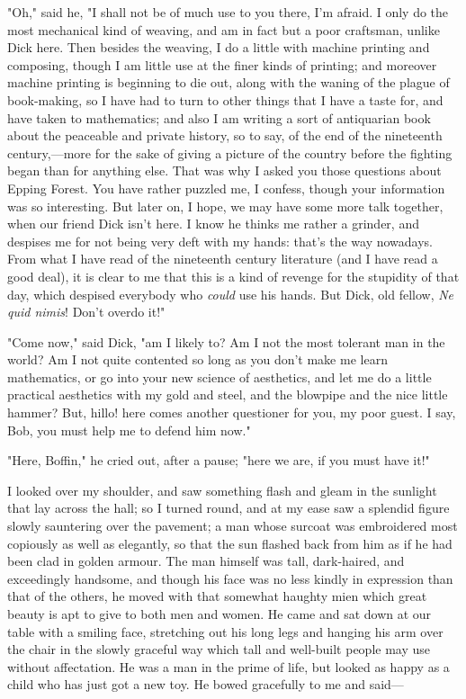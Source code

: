 "Oh," said he, "I shall not be of much use to you there, I'm afraid. I
only do the most mechanical kind of weaving, and am in fact but a poor
craftsman, unlike Dick here. Then besides the weaving, I do a little
with machine printing and composing, though I am little use at the finer
kinds of printing; and moreover machine printing is beginning to die
out, along with the waning of the plague of book-making, so I have had
to turn to other things that I have a taste for, and have taken to
mathematics; and also I am writing a sort of antiquarian book about the
peaceable and private history, so to say, of the end of the nineteenth
century,---more for the sake of giving a picture of the country before
the fighting began than for anything else. That was why I asked you
those questions about Epping Forest. You have rather puzzled me, I
confess, though your information was so interesting. But later on, I
hope, we may have some more talk together, when our friend Dick isn't
here. I know he thinks me rather a grinder, and despises me for not
being very deft with my hands: that's the way nowadays. From what I have
read of the nineteenth century literature (and I have read a good deal),
it is clear to me that this is a kind of revenge for the stupidity of
that day, which despised everybody who \emph{could} use his hands. But
Dick, old fellow, \emph{Ne quid nimis}! Don't overdo it!"

"Come now," said Dick, "am I likely to? Am I not the most tolerant man
in the world? Am I not quite contented so long as you don't make me
learn mathematics, or go into your new science of aesthetics, and let me
do a little practical aesthetics with my gold and steel, and the
blowpipe and the nice little hammer? But, hillo! here comes another
questioner for you, my poor guest. I say, Bob, you must help me to
defend him now."

"Here, Boffin," he cried out, after a pause; "here we are, if you must
have it!"

I looked over my shoulder, and saw something flash and gleam in the
sunlight that lay across the hall; so I turned round, and at my ease saw
a splendid figure slowly sauntering over the pavement; a man whose
surcoat was embroidered most copiously as well as elegantly, so that the
sun flashed back from him as if he had been clad in golden armour. The
man himself was tall, dark-haired, and exceedingly handsome, and though
his face was no less kindly in expression than that of the others, he
moved with that somewhat haughty mien which great beauty is apt to give
to both men and women. He came and sat down at our table with a smiling
face, stretching out his long legs and hanging his arm over the chair in
the slowly graceful way which tall and well-built people may use without
affectation. He was a man in the prime of life, but looked as happy as a
child who has just got a new toy. He bowed gracefully to me and said---

